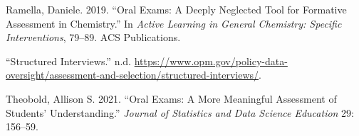 \documentclass[
  letterpaper,
  DIV=11,
  numbers=noendperiod]{scrartcl}
\newlength{\cslhangindent}
\newlength{\cslentryspacingunit} %
\newenvironment{CSLReferences}[2] %
 {%
  \setlength{\parindent}{0pt}
  \ifodd #1
  \let\oldpar\par
  \def\par{\hangindent=\cslhangindent\oldpar}
  \fi
  \setlength{\parskip}{#2\cslentryspacingunit}
 }%
 {}
\begin{document}
\begin{CSLReferences}{1}{0}
\leavevmode{}%
Ramella, Daniele. 2019. {``Oral Exams: A Deeply Neglected Tool for
Formative Assessment in Chemistry.''} In \emph{Active Learning in
General Chemistry: Specific Interventions}, 79--89. ACS Publications.

\leavevmode{}%
{``Structured Interviews.''} n.d.
\url{https://www.opm.gov/policy-data-oversight/assessment-and-selection/structured-interviews/}.

\leavevmode{}%
Theobold, Allison S. 2021. {``Oral Exams: A More Meaningful Assessment
of Students' Understanding.''} \emph{Journal of Statistics and Data
Science Education} 29: 156--59.

\end{CSLReferences}
\end{document}
